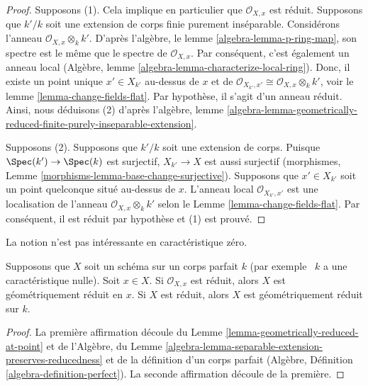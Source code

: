 \begin{proof}
Supposons (1). Cela implique en particulier que
$\mathcal{O}_{X, x}$ est réduit. Supposons que $k'/k$ soit une
extension de corps finie purement inséparable. Considérons
l'anneau $\mathcal{O}_{X, x} \otimes_k k'$. D'après l'algèbre,
le lemme \ref{algebra-lemma-p-ring-map}, son spectre est le
même que le spectre de $\mathcal{O}_{X, x}$. Par conséquent,
c'est également un anneau local (Algèbre, lemme
\ref{algebra-lemma-characterize-local-ring}). Donc, il existe un
point unique $x' \in X_{k'}$ au-dessus de $x$ et de
$\mathcal{O}_{X_{k'}, x'} \cong \mathcal{O}_{X, x} \otimes_k k'$, voir
le lemme \ref{lemma-change-fields-flat}. Par hypothèse, il s'agit d'un
anneau réduit. Ainsi, nous déduisons (2) d'après l'algèbre, lemme
\ref{algebra-lemma-geometrically-reduced-finite-purely-inseparable-extension}.

\medskip\noindent
Supposons (2). Supposons que $k'/k$ soit une extension
de corps. Puisque $\Spec(k') \to \Spec(k)$ est surjectif,
$X_{k'} \to X$ est aussi surjectif (morphismes, Lemme
\ref{morphisms-lemma-base-change-surjective}). Supposons
que $x' \in X_{k'}$ soit un point quelconque situé
au-dessus de $x$. L'anneau local $\mathcal{O}_{X_{k'}, x'}$
est une localisation de l'anneau $\mathcal{O}_{X, x}
\otimes_k k'$ selon le Lemme \ref{lemma-change-fields-flat}.
Par conséquent, il est réduit par hypothèse et (1) est prouvé.
\end{proof}

\noindent
La notion n'est pas intéressante en caractéristique zéro.

\begin{lemma}
\label{lemma-perfect-reduced}
Supposons que $X$ soit un schéma sur un corps parfait $k$ (par
exemple \ $k$ a une caractéristique nulle). Soit $x \in X$. Si
$\mathcal{O}_{X, x}$ est réduit, alors $X$ est géométriquement réduit
en $x$. Si $X$ est réduit, alors $X$ est géométriquement réduit sur $k$.
\end{lemma}

\begin{proof}
La première affirmation découle du Lemme
\ref{lemma-geometrically-reduced-at-point} et de
l'Algèbre, du Lemme
\ref{algebra-lemma-separable-extension-preserves-reducedness} et de
la définition d'un corps parfait (Algèbre, Définition
\ref{algebra-definition-perfect}). La seconde affirmation découle de la première.
\end{proof}

